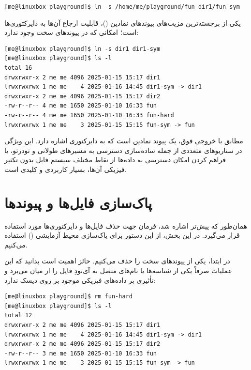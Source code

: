 \begin{latin}
\begin{lstlisting}
[me@linuxbox playground]$ ln -s /home/me/playground/fun dir1/fun-sym
\end{lstlisting}
\end{latin}

یکی از برجسته‌ترین مزیت‌های پیوندهای نمادین ()، قابلیت ارجاع آن‌ها به دایرکتوری‌ها است؛ امکانی که در پیوندهای سخت وجود ندارد:

\begin{latin}
\begin{lstlisting}
[me@linuxbox playground]$ ln -s dir1 dir1-sym
[me@linuxbox playground]$ ls -l
total 16
drwxrwxr-x 2 me me 4096 2025-01-15 15:17 dir1
lrwxrwxrwx 1 me me    4 2025-01-16 14:45 dir1-sym -> dir1
drwxrwxr-x 2 me me 4096 2025-01-15 15:17 dir2
-rw-r--r-- 4 me me 1650 2025-01-10 16:33 fun
-rw-r--r-- 4 me me 1650 2025-01-10 16:33 fun-hard
lrwxrwxrwx 1 me me    3 2025-01-15 15:15 fun-sym -> fun
\end{lstlisting}
\end{latin}

مطابق با خروجی فوق،  یک پیوند نمادین است که به دایرکتوری  اشاره دارد. این ویژگی در سناریوهای متعددی از جمله ساده‌سازی دسترسی به مسیرهای طولانی و تودرتو، یا فراهم کردن امکان دسترسی به داده‌ها از نقاط مختلف سیستم فایل بدون تکثیر فیزیکی آن‌ها، بسیار کاربردی و کلیدی است.

\section{پاک‌سازی فایل‌ها و پیوندها}

همان‌طور که پیش‌تر اشاره شد، فرمان  جهت حذف فایل‌ها و دایرکتوری‌ها مورد استفاده قرار می‌گیرد. در این بخش، از این دستور برای پاک‌سازی محیط آزمایشی () استفاده می‌کنیم.

در ابتدا، یکی از پیوندهای سخت را حذف می‌کنیم. حائز اهمیت است بدانید که این عملیات صرفاً یکی از شناسه‌ها یا نام‌های متصل به آی‌نودِ فایل را از میان می‌برد و تأثیری بر داده‌های فیزیکی موجود بر روی دیسک ندارد:

\begin{latin}
\begin{lstlisting}
[me@linuxbox playground]$ rm fun-hard
[me@linuxbox playground]$ ls -l
total 12
drwxrwxr-x 2 me me 4096 2025-01-15 15:17 dir1
lrwxrwxrwx 1 me me    4 2025-01-16 14:45 dir1-sym -> dir1
drwxrwxr-x 2 me me 4096 2025-01-15 15:17 dir2
-rw-r--r-- 3 me me 1650 2025-01-10 16:33 fun
lrwxrwxrwx 1 me me    3 2025-01-15 15:15 fun-sym -> fun
\end{lstlisting}
\end{latin}

